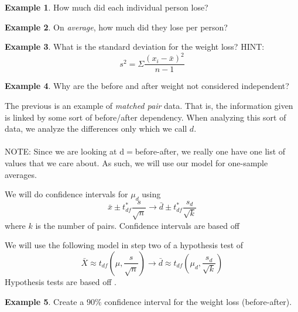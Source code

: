 \documentclass[12pt]{amsart}
\theoremstyle{definition}
\newtheorem{ex}{Example}
\begin{document}
 \begin{ex} How much did each individual person lose?\end{ex}
 \begin{ex} On \emph{average}, how much did they lose per person?\end{ex}
 \vspace{1in}
 
 \begin{ex} What is the standard deviation for the weight loss? HINT: $$s^2=\Sigma \frac{(x_i-\bar{x})^2}{n-1}$$
 \end{ex}

 \vspace{1in}
 
 \begin{ex} Why are the before and after weight not considered independent?\end{ex}
 \vfill
 \newpage
 \noindent The previous is an example of \emph{matched pair} data. That is, the information given is linked by some sort of before/after dependency. When analyzing this sort of data, we analyze the differences only which we call $d$.\\
 ~\\
 NOTE: Since we are looking at d$=$before-after, we really one have one list of values that we care about. As such, we will use our model for one-sample averages.
 
 
 
\begin{framed}
  We will do confidence intervals for $\mu_d$ using $$\bar{x}\pm t_{df}^* \frac{s}{\sqrt{n}}\rightarrow\bar{d}\pm t_{df}^* \frac{s_d}{\sqrt{k}}$$ where $k$ is the number of pairs. Confidence intervals are based off \underline{\hspace{1in}}
 \end{framed} 
 
\begin{framed}
We will use the following model in step two of a hypothesis test of $$\bar{X}\approx t_{df}\left(\mu, \frac{s}{\sqrt{n}}\right)\rightarrow\bar{d}\approx t_{df}\left(\mu_d, \frac{s_d}{\sqrt{k}}\right)$$ Hypothesis tests are based off \underline{\hspace{1in}}.
\end{framed}
\vspace{0.25in}

\begin{ex} Create a $90\%$ confidence interval for the weight loss (before-after). \end{ex}
\vfill
\end{document}
